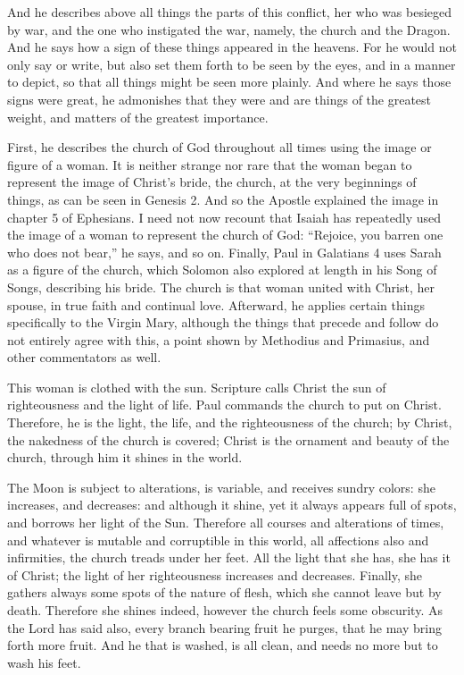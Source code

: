 And he describes above all things the parts of this conflict, her who was besieged by war, and the one who instigated the war, namely, the church and the Dragon. And he says how a sign of these things appeared in the heavens. For he would not only say or write, but also set them forth to be seen by the eyes, and in a manner to depict, so that all things might be seen more plainly. And where he says those signs were great, he admonishes that they were and are things of the greatest weight, and matters of the greatest importance.

First, he describes the church of God throughout all times using the image or figure of a woman. It is neither strange nor rare that the woman began to represent the image of Christ’s bride, the church, at the very beginnings of things, as can be seen in Genesis 2. And so the Apostle explained the image in chapter 5 of Ephesians. I need not now recount that Isaiah has repeatedly used the image of a woman to represent the church of God: “Rejoice, you barren one who does not bear,” he says, and so on. Finally, Paul in Galatians 4 uses Sarah as a figure of the church, which Solomon also explored at length in his Song of Songs, describing his bride. The church is that woman united with Christ, her spouse, in true faith and continual love. Afterward, he applies certain things specifically to the Virgin Mary, although the things that precede and follow do not entirely agree with this, a point shown by Methodius and Primasius, and other commentators as well.

This woman is clothed with the sun. Scripture calls Christ the sun of righteousness and the light of life. Paul commands the church to put on Christ. Therefore, he is the light, the life, and the righteousness of the church; by Christ, the nakedness of the church is covered; Christ is the ornament and beauty of the church, through him it shines in the world.

The Moon is subject to alterations, is variable, and receives sundry colors: she increases, and decreases: and although it shine, yet it always appears full of spots, and borrows her light of the Sun. Therefore all courses and alterations of times, and whatever is mutable and corruptible in this world, all affections also and infirmities, the church treads under her feet. All the light that she has, she has it of Christ; the light of her righteousness increases and decreases. Finally, she gathers always some spots of the nature of flesh, which she cannot leave but by death. Therefore she shines indeed, however the church feels some obscurity. As the Lord has said also, every branch bearing fruit he purges, that he may bring forth more fruit. And he that is washed, is all clean, and needs no more but to wash his feet.

